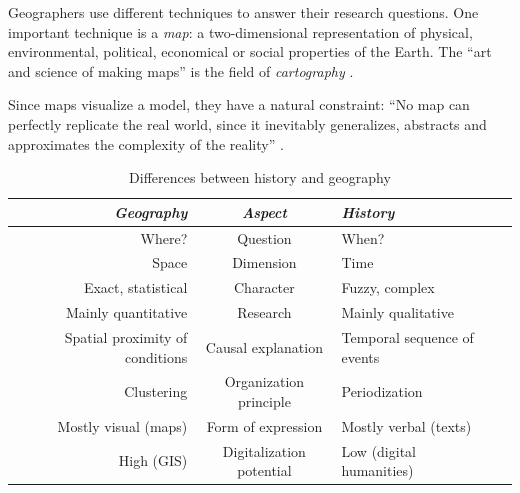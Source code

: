 Geographers use different techniques to answer their research questions. One important technique is a \emph{map}: a two-dimensional representation of physical, environmental, political, economical or social properties of the Earth. The ``art and science of making maps'' is the field of \emph{cartography} \cite{cartography}.

Since maps visualize a model, they have a natural constraint: ``No map can perfectly replicate the real world, since it inevitably generalizes, abstracts and approximates the complexity of the reality''
\cite[p. 181]{knowles2008placing}.



\vspace{3em}

\begin{table}[ht]
\begin{center}
\begin{tabular}{p{0px} r c l p{0px}}
    \toprule
    & \emph{Geography}
    & \emph{Aspect}
    & \emph{History}
    & \\
    \midrule
    & Where?
    & Question
    & When?
    & \\

    & Space
    & Dimension
    & Time
    & \\

    & Exact, statistical
    & Character
    & Fuzzy, complex
    & \\

    & Mainly quantitative
    & Research
    & Mainly qualitative
    & \\

    & Spatial proximity of conditions
    & Causal explanation
    & Temporal sequence of events
    & \\

    & Clustering
    & Organization principle
    & Periodization
    & \\

    & Mostly visual (maps)
    & Form of expression
    & Mostly verbal (texts)
    & \\

    & High (GIS)
    & Digitalization potential
    & Low (digital humanities)
    & \\

    \bottomrule
\end{tabular}
\caption{Differences between history and geography \cite[pp. 2-4]{knowles2008placing}}
\label{tab:history_vs_geography}
\end{center}
\end{table}

